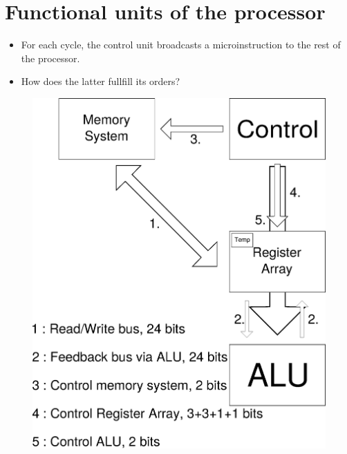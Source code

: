 \documentclass{beamer}
\begin{document}
\section{Functional units of the processor}

\begin{frame}
\begin{itemize}
\item For each cycle, the control unit broadcasts a microinstruction to the rest
of the processor. 
\item How does the latter fullfill its orders?
\end{itemize}
\end{frame}

\begin{frame}
\begin{figure}
\center
\includegraphics[scale=0.3]{globalArchi.eps}
\end{figure}
\end{frame}
\end{document}
